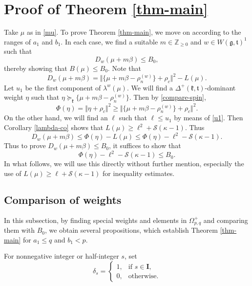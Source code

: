 \documentclass[11pt]{amsart}
\theoremstyle{plain}
\theoremstyle{definition}
\newcommand{\mfg}{\mathfrak{g}}
\newcommand{\mfk}{\mathfrak{k}}
\newcommand{\mft}{\mathfrak{t}}
\newcommand{\bbZ}{\mathbb{Z}}
\newcommand{\caS}{\mathcal{S}}
\begin{document}
\section{Proof of Theorem \ref{thm-main}}\label{sec-proof}
Take $\mu$ as in \eqref{mu}. To prove Theorem \ref{thm-main}, we move on according to the ranges of $a_1$ and $b_1$. In each case, we find a suitable $m\in\bbZ_{\ge 0}$ and $w\in W(\mfg,\mft)^1$ such that
\[D_w(\mu+m\beta)\le B_0,\]
thereby showing that $B(\mu)\le B_0$. Note that
\begin{equation}\label{D}
	D_w(\mu+m\beta)= \Vert\{\mu+m\beta-\rho_n^{(w)}\}+\rho_c \Vert^2-L(\mu).
\end{equation}
Let $u_1$ be the first component of $\lambda^w(\mu)$. We will find a $\Delta^+(\mfk,\mft)$-dominant weight $\eta$ such that $\eta\succeq_\mfk \{\mu+m\beta-\rho_n^{(w)}\}$.
Then by \eqref{compare-spin},
$$
\Phi(\eta)=\Vert \eta+\rho_c \Vert^2 \ge\Vert\{\mu+m\beta-\rho_n^{(w)}\}+\rho_c \Vert^2.
$$
On the other hand, we will find an $\ell$ such that $\ell\le u_1$ by means of \eqref{u1}. Then  Corollary \ref{lambda-co} shows that $L(\mu)\ge \ell^2+\caS(\kappa-1)$.  Thus
\[D_w(\mu+m\beta)\le \Phi(\eta)-L(\mu)\le \Phi(\eta)-\ell^2-\caS(\kappa-1).\]
Thus to prove $D_w(\mu+m\beta)\le B_0$, it suffices  to show that
$$
\Phi(\eta)-\ell^2-\caS(\kappa-1)\le B_0.
$$
In what follows, we will use this directly without further mention, especially the use of $L(\mu)\ge \ell+\caS(\kappa-1)$ for inequality estimates.

\subsection{Comparison of weights}\label{CW}

In this subsection, by finding special weights and elements in $\Omega_{p,q}^+$ and comparing them with $B_0$, we obtain several propositions, which establish Theorem \ref{thm-main} for $a_1\le q$ and $b_1<p$.

For nonnegative integer or half-integer $s$, set
\begin{equation}\label{delta-s}
	\delta_s=\left\{
	\begin{array}{ll}
		1, & \mbox{if $s\in \textbf{I}$},\\
		0, & \mbox{otherwise}.
	\end{array}
	\right.
\end{equation}
\end{document}
